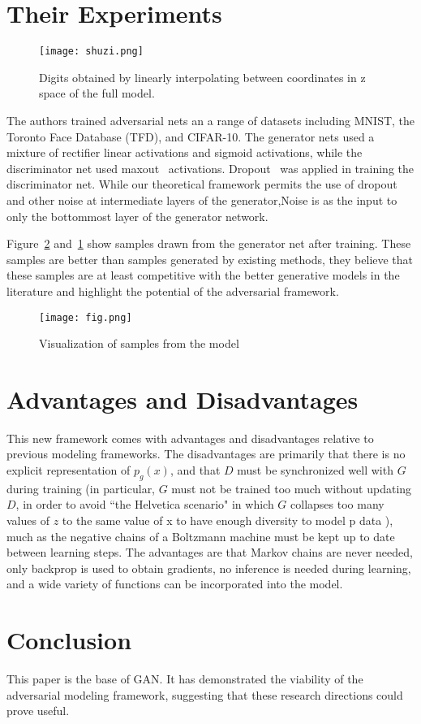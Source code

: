 \documentclass[10pt,twocolumn,letterpaper]{article}
\begin{document}
\section{Their Experiments}
\begin{figure}[!htb]
	\centering
	\texttt{[image: shuzi.png]}\\
	\caption{Digits obtained by linearly interpolating between coordinates in z space of the full model.}\label{Figure3}
\end{figure}
The authors trained adversarial nets an a range of datasets including MNIST, the Toronto Face Database (TFD), and CIFAR-10. The generator nets used a mixture of rectifier linear activations and sigmoid activations, while the discriminator net used maxout~\cite{name10} activations. Dropout~\cite{name17} was applied in training the discriminator net. While our theoretical framework permits the use of dropout and other noise at intermediate layers of the generator,Noise is as the input to only
the bottommost layer of the generator network.
\par Figure~\ref{Figure2} and~\ref{Figure3} show samples drawn from the generator net after training. These samples are better than samples generated by existing methods, they believe that these samples are at least competitive with the better generative models in the literature and highlight the
potential of the adversarial framework.
\begin{figure}[!htb]
	\centering
	\texttt{[image: fig.png]}\\
	\caption{Visualization of samples from the model}\label{Figure2}
\end{figure}
\section{Advantages and Disadvantages}
This new framework comes with advantages and disadvantages relative to previous modeling frameworks. The disadvantages are primarily that there is no explicit representation of $p_g(x)$, and that $D$ must be synchronized well with $G$ during training (in particular, $G$ must not be trained too much without updating $D$, in order to avoid ``the Helvetica scenario" in which $G$ collapses too many values of $z$ to the same value of x to have enough diversity to model p data ), much as the negative chains of a
Boltzmann machine must be kept up to date between learning steps. The advantages are that Markov chains are never needed, only backprop is used to obtain gradients, no inference is needed during learning, and a wide variety of functions can be incorporated into the model.
\section{Conclusion}
This paper is the base of GAN. It has demonstrated the viability of the adversarial modeling framework, suggesting that these research directions could prove useful.


\end{document}
